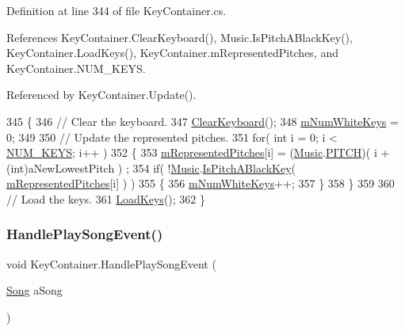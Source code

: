 Definition at line 344 of file Key\+Container.\+cs.



References Key\+Container.\+Clear\+Keyboard(), Music.\+Is\+Pitch\+A\+Black\+Key(), Key\+Container.\+Load\+Keys(), Key\+Container.\+m\+Represented\+Pitches, and Key\+Container.\+N\+U\+M\+\_\+\+K\+E\+YS.



Referenced by Key\+Container.\+Update().


\begin{DoxyCode}
345     \{
346         \textcolor{comment}{// Clear the keyboard.}
347         \hyperlink{group___key_contain_priv_func_ga679f5ca9d6b1505180e90ee00bbfe616}{ClearKeyboard}();
348         \hyperlink{group___key_contain_priv_var_ga7a5547a1fe5c40eac487fe6c826c8f9c}{mNumWhiteKeys} = 0;
349 
350         \textcolor{comment}{// Update the represented pitches.}
351         \textcolor{keywordflow}{for}( \textcolor{keywordtype}{int} i = 0; i < \hyperlink{group___key_contain_const_gaa8fe6473e6396976e52c5793f027380e}{NUM\_KEYS}; i++ )
352         \{
353             \hyperlink{group___key_contain_priv_var_ga103945a6efe3469191e5253d13fec5be}{mRepresentedPitches}[i] = (\hyperlink{class_music}{Music}.\hyperlink{group___music_enums_ga508f69b199ea518f935486c990edac1d}{PITCH})( i + (\textcolor{keywordtype}{int})aNewLowestPitch )
      ;
354             \textcolor{keywordflow}{if}( !\hyperlink{class_music}{Music}.\hyperlink{group___music_stat_func_gacc2c1a66df7197225f61c5737f794065}{IsPitchABlackKey}( 
      \hyperlink{group___key_contain_priv_var_ga103945a6efe3469191e5253d13fec5be}{mRepresentedPitches}[i] ) )
355             \{
356                 \hyperlink{group___key_contain_priv_var_ga7a5547a1fe5c40eac487fe6c826c8f9c}{mNumWhiteKeys}++;
357             \}
358         \}
359 
360         \textcolor{comment}{// Load the keys.}
361         \hyperlink{group___key_contain_priv_func_ga65f79700f265d2223681ac95981ab4a3}{LoadKeys}();
362     \}
\end{DoxyCode}
\mbox{\label{group___key_contain_event_handlers_ga894c823059c5268af0954f83c04036ed}} 
\subsubsection{\texorpdfstring{Handle\+Play\+Song\+Event()}{HandlePlaySongEvent()}}
{\footnotesize\ttfamily void Key\+Container.\+Handle\+Play\+Song\+Event (\begin{DoxyParamCaption}\item[{\hyperlink{class_song}{Song}}]{a\+Song }\end{DoxyParamCaption})\hspace{0.3cm}{\ttfamily [private]}}



